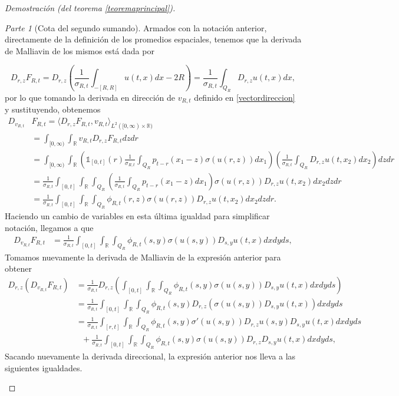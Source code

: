 \documentclass[letterpaper,twoside,12pt]{book}
\newcommand{\R}{\mathbb{R}}
\newcommand{\1}{\mathds{1}}
\theoremstyle{definition}
\theoremstyle{definition}
\theoremstyle{remark}
\newtheorem{proofpart}{Parte}
\theoremstyle{definition}
\theoremstyle{definition}
\theoremstyle{definition}
\theoremstyle{definition}
\theoremstyle{definition}
\begin{document}
\begin{proof}[Demostración (del teorema \ref{teoremaprincipal})]
\begin{proofpart}[Cota del segundo sumando]
Armados con la notación anterior, directamente de la definición de los promedios espaciales, tenemos que la derivada de Malliavin de los mismos está dada por 

\[
   D_{r,z}F_{R,t}=D_{r,z}\left(\frac{1}{\sigma_{R,t}}\int_{-[R,R]}u(t,x)dx-2R\right)=\frac{1}{\sigma_{R,t}}\int_{Q_R}D_{r,z}u(t,x)dx,
\]
por lo que tomando la derivada en dirección de $v_{R,t}$ definido en \eqref{vectordireccion} y sustituyendo, obtenemos 
\begin{align*}
   D_{v_{R,t}}&F_{R,t}=\langle D_{r,z}F_{R,t},v_{R,t}\rangle_{L^{2}([0,\infty)\times\R)}\\
   &=\int_{[0,\infty)}\int_\R v_{R,t}D_{r,z}F_{R,t}dz dr\\
   &=\int_{[0,\infty)}\int_\R\left(\1_{[0,t]}(r)\frac{1}{\sigma_{R,t}}\int_{Q_R}p_{t-r}(x_1-z)\sigma(u(r,z))dx_1\right)\left(\frac{1}{\sigma_{R,t}}\int_{Q_R}D_{r,z}u(t,x_2)dx_2\right) dz dr\\
   &=\frac{1}{\sigma_{R,t}}\int_{[0,t]}\int_\R \int_{Q_R}\left(\frac{1}{\sigma_{R,t}}\int_{Q_R}p_{t-r}(x_1-z)dx_1\right)\sigma(u(r,z))D_{r,z}u(t,x_2) dx_2dz dr\\
   &=\frac{1}{\sigma_{R,t}}\int_{[0,t]}\int_\R \int_{Q_R}\phi_{R,t}(r,z)\sigma(u(r,z))D_{r,z}u(t,x_2) dx_2dz dr.
\end{align*}
Haciendo un cambio de variables en esta última igualdad para simplificar notación, llegamos a que
\begin{align*}
D_{v_{R,t}}F_{R,t}&=\frac{1}{\sigma_{R,t}}\int_{[0,t]}\int_\R \int_{Q_R}\phi_{R,t}(s,y)\sigma(u(s,y))D_{s,y}u(t,x) dx dy ds,
\end{align*}
 Tomamos nuevamente la derivada de Malliavin de la expresión anterior para obtener 
\begin{align*}
   D_{r,z}(D_{v_{R,t}}F_{R,t})&=\frac{1}{\sigma_{R,t}}D_{r,z}\left(\int_{[0,t]}\int_\R \int_{Q_R}\phi_{R,t}(s,y)\sigma(u(s,y))D_{s,y}u(t,x) dx dy ds\right)\\
   &=\frac{1}{\sigma_{R,t}}\int_{[0,t]}\int_\R \int_{Q_R}\phi_{R,t}(s,y)D_{r,z}\left(\sigma(u(s,y))D_{s,y}u(t,x)\right) dx dy ds\\
   &=\frac{1}{\sigma_{R,t}}\int_{[r,t]}\int_\R \int_{Q_R}\phi_{R,t}(s,y)\sigma'(u(s,y))D_{r,z}u(s,y)D_{s,y}u(t,x)dx dy ds\\
   & \ \ \ +\frac{1}{\sigma_{R,t}}\int_{[0,t]}\int_\R \int_{Q_R}\phi_{R,t}(s,y)\sigma(u(s,y))D_{r,z}D_{s,y}u(t,x)dx dy ds,
\end{align*}
Sacando nuevamente la derivada direccional, la expresión anterior nos lleva a las siguientes igualdades.

\end{proofpart}
\end{proof}
\end{document}
